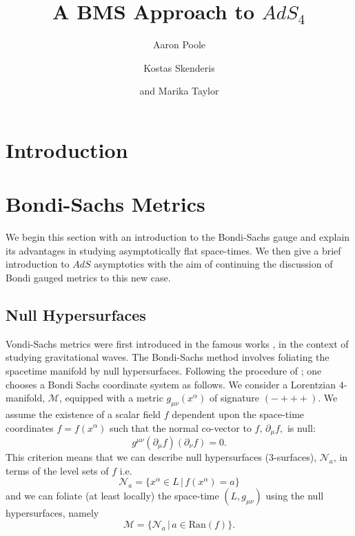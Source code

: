 \documentclass[a4paper,11pt]{article}
\title{A BMS Approach to $AdS_4$}
\author{Aaron Poole}
\author{Kostas Skenderis}
\author{ and Marika Taylor}
\affiliation{Mathematical Sciences and STAG Research Centre, University of Southampton \\
Highfield, Southampton SO17 1BJ, United Kingdom.}
\numberwithin{equation}{section}
\begin{document}
\maketitle
\flushbottom


\section{Introduction}


\section{Bondi-Sachs Metrics} \label{sec: Bondi-Sachs_metrics}


We begin this section with an introduction to the Bondi-Sachs gauge and explain its advantages in studying asymptotically flat space-times. We then give a brief introduction to $AdS$ asymptotics with the aim of continuing the discussion of Bondi gauged metrics to this new case.

\subsection{Null Hypersurfaces}

Vondi-Sachs metrics were first introduced in the famous works \cite{Bondi:1962px, Sachs:1962wk}, in the context of studying gravitational waves. The Bondi-Sachs method involves foliating the spacetime manifold by null hypersurfaces. Following the procedure of \cite{Sachs:1962wk}; one chooses a Bondi Sachs coordinate system as follows. We consider a Lorentzian $4$-manifold, $\mathcal{M}$, equipped with a metric $g_{\mu \nu}(x^{\alpha})$ of signature $(-+++)$. We assume the existence of a scalar field $f$ dependent upon the space-time coordinates $f=f(x^{\alpha})$ such that the normal co-vector to $f$, $\partial_{\mu} f,$ is null: 
\begin{equation}
g^{\mu \nu}( \partial_{\mu} f)( \partial_{\nu} f)=0.
\end{equation} 
This criterion means that we can describe null hypersurfaces (3-surfaces), $\mathcal{N}_a$, in terms of the level sets of $f$ i.e. 
\begin{equation}
\mathcal{N}_a=\{x^{\alpha} \in L \, | \, f(x^{\alpha})=a\} 
\end{equation} 
and we can foliate (at least locally) the space-time $(L, g_{\mu \nu})$ using the null hypersurfaces, namely
\begin{equation}
\mathcal{M}=\{\mathcal{N}_a \, | \, a \in \text{Ran}(f)\}.
\end{equation}
\end{document}
